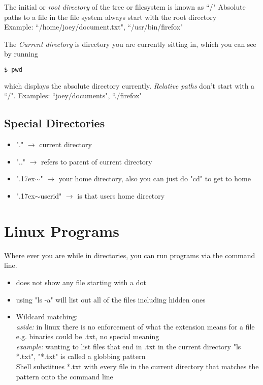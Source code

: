\documentclass[12pt,oneside,fleqn]{book}
\begin{document}
\newpage
The initial or \emph{root directory} of the tree or filesystem is known as ``/"
Absolute paths to a file in the file system always start with the root directory \\
Example: ``/home/joey/document.txt", ``/usr/bin/firefox"

The \emph{Current directory} is directory you are currently sitting in, which you can see by running
\begin{lstlisting}[frame=single,language=bash]
	$ pwd
	\end{lstlisting}
which displays the absolute directory currently.
\emph{Relative paths} don't start with a ``/".
Examples: ``joey/documents", ``./firefox" \\

\subsection{Special Directories}
\begin{itemize}
\item "." $\to$ current directory
\item ".." $\to$ refers to parent of current directory
\item "{\raise.17ex\hbox{$\scriptstyle\mathtt{\sim}$}}" $\to$ your home directory, also you can just do "cd" to get to home
\item "{\raise.17ex\hbox{$\scriptstyle\mathtt{\sim}$}}userid" $\to$ is that users home directory
\end{itemize}

\section{Linux Programs}
Where ever you are while in directories, you can run programs via the command line.
\
\begin{itemize}
\item does not show any file starting with a dot
\item using "ls -a" will list out all of the files including hidden ones
\item Wildcard matching: \\
{\it aside:} in linux there is no enforcement of what the extension means for a file e.g. binaries could be .txt, no special meaning \\
{\it example:} wanting to list files that end in .txt in the current directory
"ls *.txt", "*.txt" is called a globbing pattern \\
Shell substitues *.txt with every file in the current directory that matches the pattern onto the command line
\end{itemize}
\end{document}
